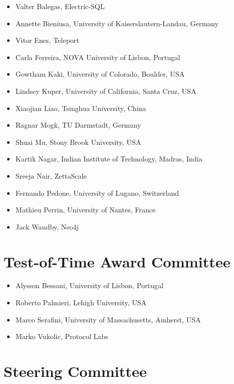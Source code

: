 \documentclass[acmlarge,nonacm]{acmart}
\begin{document}
\begin{itemize}
\item Valter Balegas, Electric-SQL
\item Annette Bieniusa, University of Kaiserslautern-Landau, Germany
\item Vitor Enes, Teleport
\item Carla Ferreira, NOVA University of Lisbon, Portugal
\item Gowtham Kaki, University of Colorado, Boulder, USA
\item Lindsey Kuper, University of California, Santa Cruz, USA
\item Xiaojian Liao, Tsinghua University, China
\item Ragnar Mogk, TU Darmstadt, Germany
\item Shuai Mu, Stony Brook University, USA
\item Kartik Nagar, Indian Institute of Technology, Madras, India
\item Sreeja Nair, ZettaScale
\item Fernando Pedone, University of Lugano, Switzerland
\item Mathieu Perrin, University of Nantes, France
\item Jack Waudby, Neo4j
\end{itemize}

\section*{Test-of-Time Award Committee}

\begin{itemize}
\item Alysson Bessani, University of Lisbon, Portugal
\item Roberto Palmieri, Lehigh University, USA
\item Marco Serafini, University of Massachusetts, Amherst, USA
\item Marko Vukolic, Protocol Labs
\end{itemize}

\section*{Steering Committee}
\end{document}
